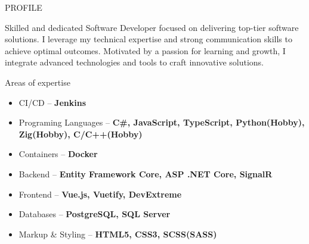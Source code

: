 \documentclass{resume}
\begin{document}
\begin{rSection}{PROFILE}
{
    Skilled and dedicated Software Developer focused on delivering top-tier software solutions. 
    I leverage my technical expertise and strong communication skills to achieve optimal outcomes. 
    Motivated by a passion for learning and growth, I integrate advanced technologies and tools to craft innovative solutions.

}
\end{rSection}

\begin{rSection}{Areas of expertise}
    \begin{minipage}[t]{0.33\textwidth}
        \begin{flushleft}
            \begin{itemize}[leftmargin=0.5cm]
                \setlength\itemsep{0.4em}
                \item CI/CD – \textbf{Jenkins}
                \item Programing Languages – \textbf{C\#, JavaScript, TypeScript, Python(Hobby), Zig(Hobby), C/C++(Hobby)}
                \item Containers – \textbf{Docker}
            \end{itemize}
        \end{flushleft}
    \end{minipage}
    \begin{minipage}[t]{0.33\textwidth}
        \begin{flushleft}
            \begin{itemize}[leftmargin=0.5cm]
                \setlength\itemsep{0.4em}
                \item Backend – \textbf{Entity Framework Core, ASP .NET Core, SignalR}
                \item Frontend – \textbf{Vue.js, Vuetify, DevExtreme}
            \end{itemize}
        \end{flushleft}
    \end{minipage}
    \begin{minipage}[t]{0.33\textwidth}
        \begin{flushleft}
            \begin{itemize}[leftmargin=0.5cm]
                \setlength\itemsep{0.4em}
                \item Databases – \textbf{PostgreSQL, SQL Server}
                \item Markup \& Styling – \textbf{HTML5, CSS3, SCSS(SASS)}
            \end{itemize}
        \end{flushleft}
    \end{minipage}
\end{rSection}
\end{document}
